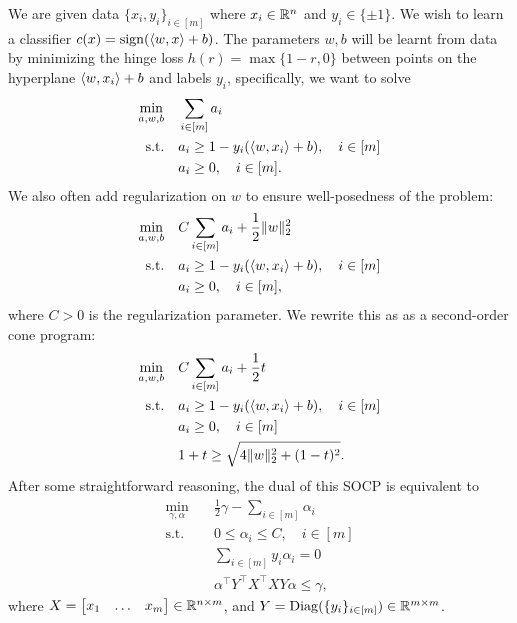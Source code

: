 \documentclass[11pt,oneside]{article}
\theoremstyle{plain}
\theoremstyle{definition}
\theoremstyle{remark}
\begin{document}
We are given data $\{x_i,y_i\}_{i \in [m]}$ where $x_i \in \mathbb{R}^n$ and $y_i \in \{\pm 1\}$. We wish to learn a classifier $c(x) = \operatorname{sign}(\langle w,x \rangle + b)$. The parameters $w,b$ will be learnt from data by minimizing the hinge loss $h(r) = \max\{1-r,0\}$ between points on the hyperplane $\langle w,x_i \rangle + b$ and labels $y_i$, specifically, we want to solve
\begin{align*}
\min_{a,w,b} &\quad \sum_{i \in [m]} a_i\\
\text{s.t.} &\quad a_i \geq 1 - y_i(\langle w,x_i \rangle + b), \quad i \in [m]\\
&\quad a_i \geq 0, \quad i \in [m].
\end{align*}
We also often add regularization on $w$ to ensure well-posedness of the problem:
\begin{align*}
\min_{a,w,b} &\quad C \sum_{i \in [m]} a_i + \frac{1}{2} \|w\|_2^2\\
\text{s.t.} &\quad a_i \geq 1 - y_i(\langle w,x_i \rangle + b), \quad i \in [m]\\
&\quad a_i \geq 0, \quad i \in [m],
\end{align*}
where $C > 0$ is the regularization parameter. We rewrite this as as a second-order cone program:
\begin{align*}
\min_{a,w,b} &\quad C \sum_{i \in [m]} a_i + \frac{1}{2} t\\
\text{s.t.} &\quad a_i \geq 1 - y_i(\langle w,x_i \rangle + b), \quad i \in [m]\\
&\quad a_i \geq 0, \quad i \in [m]\\
&\quad 1+t \geq \sqrt{4 \|w\|_2^2 + (1-t)^2}.
\end{align*}
After some straightforward reasoning, the dual of this SOCP is equivalent to
\begin{align*}
\min_{\gamma,\alpha} &\quad \frac{1}{2} \gamma - \sum_{i \in [m]} \alpha_i\\
\text{s.t.} &\quad 0 \leq \alpha_i \leq C, \quad i \in [m]\\
&\quad \sum_{i \in [m]} y_i \alpha_i = 0\\
&\quad \alpha^\top Y^\top X^\top X Y \alpha \leq \gamma,
\end{align*}
where $X = \begin{bmatrix} x_1 & \ldots & x_m \end{bmatrix} \in \mathbb{R}^{n \times m}$, and $Y = \operatorname{Diag}(\{y_i\}_{i \in [m]}) \in \mathbb{R}^{m \times m}$.
\end{document}

